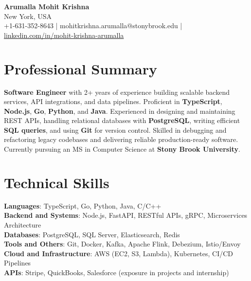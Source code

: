 \documentclass[letterpaper,11pt]{article}
\begin{document}
\begin{center}
  {\Large \textbf{Arumalla Mohit Krishna}} \\
  New York, USA \\
  +1-631-352-8643 \enspace | \enspace mohitkrishna.arumalla@stonybrook.edu \enspace | \enspace \href{https://www.linkedin.com/in/mohit-krishna-arumalla}{linkedin.com/in/mohit-krishna-arumalla}
\end{center}

\section{Professional Summary}
  \begin{itemize}[leftmargin=0.15in, label={}]
    \small{\item{
     \textbf{Software Engineer} with 2+ years of experience building scalable backend services, API integrations, and data pipelines. Proficient in \textbf{TypeScript}, \textbf{Node.js}, \textbf{Go}, \textbf{Python}, and \textbf{Java}. Experienced in designing and maintaining REST APIs, handling relational databases with \textbf{PostgreSQL}, writing efficient \textbf{SQL queries}, and using \textbf{Git} for version control. Skilled in debugging and refactoring legacy codebases and delivering reliable production-ready software. Currently pursuing an MS in Computer Science at \textbf{Stony Brook University}.
    }}
  \end{itemize}
\vspace{-16pt}

\section{Technical Skills}
 \begin{itemize}[leftmargin=0.15in, label={}]
    \small{\item{
     \textbf{Languages}: TypeScript, Go, Python, Java, C/C++ \\
     \textbf{Backend and Systems}: Node.js, FastAPI, RESTful APIs, gRPC, Microservices Architecture \\
     \textbf{Databases}: PostgreSQL, SQL Server, Elasticsearch, Redis \\
     \textbf{Tools and Others}: Git, Docker, Kafka, Apache Flink, Debezium, Istio/Envoy \\
     \textbf{Cloud and Infrastructure}: AWS (EC2, S3, Lambda), Kubernetes, CI/CD Pipelines \\
     \textbf{APIs}: Stripe, QuickBooks, Salesforce (exposure in projects and internship)
    }}
 \end{itemize}
\vspace{-16pt}
\end{document}
